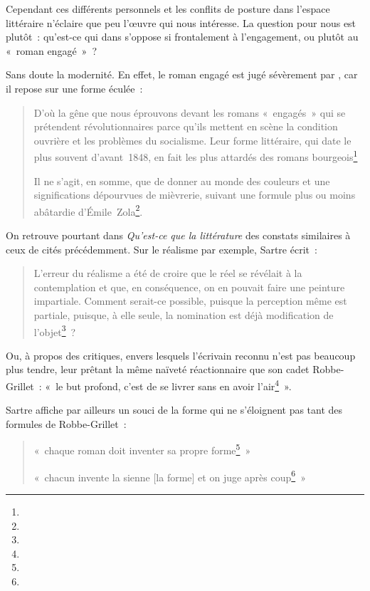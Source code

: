 \documentclass[12pt, a4paper]{article}
\begin{document}
Cependant ces différents personnels et les conflits de posture dans l'espace littéraire n'éclaire que peu l'œuvre qui nous intéresse. La question pour nous est plutôt~: qu'est-ce qui dans \punr{} s'oppose si frontalement à l'engagement, ou plutôt au «~roman engagé~»~?

Sans doute la modernité. En effet, le roman engagé est jugé sévèrement par \robbe, car il repose sur une forme éculée~: 
\begin{quote}
    D'où la gêne que nous éprouvons devant les romans «~engagés~» qui se prétendent révolutionnaires parce qu'ils mettent en scène la condition ouvrière et les problèmes du socialisme. Leur forme littéraire, qui date le plus souvent d'avant~1848, en fait les plus attardés des romans bourgeois\footnote{}

    Il ne s'agit, en somme, que de donner au monde des couleurs et une significations dépourvues de mièvrerie, suivant une formule plus ou moins abâtardie d'Émile~Zola\footnote{}.
\end{quote}


On retrouve pourtant dans \textit{Qu'est-ce que la littérature} des constats similaires à ceux de \punr cités précédemment. Sur le réalisme par exemple, Sartre écrit~:
    \begin{quote}
        L'erreur du réalisme a été de croire que le réel se révélait à la contemplation et que, en conséquence, on en pouvait faire une peinture impartiale. Comment serait-ce possible, puisque la perception même est partiale, puisque, à elle seule, la nomination est déjà modification de l'objet\footnote{}~?
    \end{quote}
 Ou, à propos des critiques, envers lesquels l'écrivain reconnu n'est pas beaucoup plus tendre, leur prêtant la même naïveté réactionnaire que son cadet Robbe-Grillet~: «~le but profond, c'est de se livrer sans en avoir l'air\footnote{}~».

Sartre affiche par ailleurs un souci de la forme qui ne s'éloignent pas tant des formules de Robbe-Grillet~: 
\begin{quote}
    «~chaque roman doit inventer sa propre forme\footnote{}~» 

    «~chacun invente la sienne [la forme] et on juge après coup\footnote{}~»
\end{quote}


\end{document}
